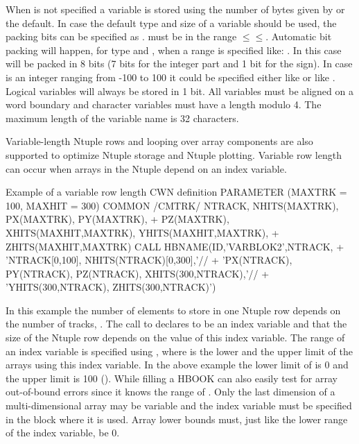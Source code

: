 When  is not specified a variable is stored using the
number of bytes given by  or the default. 
In case the default type and size of a variable should be used, the
packing bits can be specified as . 
 must be in the range \(\le\)\(\le\).
Automatic bit packing will happen, for type  and , when a range
is specified like: . In this case  will
be packed in 8 bits (7 bits for the integer part and 1 bit for the sign).
In case  is an integer ranging from -100 to 100 it could be
specified either like  or like .
Logical variables will always be stored in 1 bit.
All variables must be aligned on a word boundary and character variables
must have a length modulo 4. The maximum length of the variable name
is 32 characters.

Variable-length Ntuple rows and looping over array components
are also supported to optimize Ntuple storage and Ntuple plotting.
Variable row length can occur when arrays in the Ntuple
depend on an index variable.

\begin{XMPt}{Example of a variable row length CWN definition}
      PARAMETER (MAXTRK = 100, MAXHIT = 300)
      COMMON /CMTRK/ NTRACK, NHITS(MAXTRK), PX(MAXTRK), PY(MAXTRK),
     +               PZ(MAXTRK), XHITS(MAXHIT,MAXTRK), YHITS(MAXHIT,MAXTRK),
     +               ZHITS(MAXHIT,MAXTRK)
      CALL HBNAME(ID,'VARBLOK2',NTRACK, 
     +            'NTRACK[0,100], NHITS(NTRACK)[0,300],'//
     +            'PX(NTRACK), PY(NTRACK), PZ(NTRACK), XHITS(300,NTRACK),'//
     +            'YHITS(300,NTRACK), ZHITS(300,NTRACK)')
\end{XMPt}

In this example the number of elements to store in one Ntuple row
depends on the number of tracks, .
The call to  declares  to be an
index variable and that the size of the Ntuple row depends on the value of 
this index variable.
The range of an index variable is specified using \Lit{[<l>,<u>]},
where  is the lower and  the upper limit of the arrays
using this index variable. In the above example the 
lower limit of  is 0 and the upper limit is 100 ().
While filling a \CWN{} HBOOK can also easily test for
array out-of-bound errors since it knows the range of .
Only the last dimension of a multi-dimensional array may be variable
and the index variable must be specified in the block where it is used.
Array lower bounds must, just like the lower range of the index variable,
be 0.

